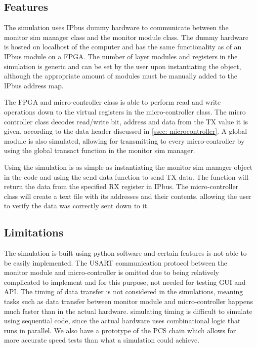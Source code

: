 \documentclass[main.tex]{subfiles}
\begin{document}

\subsection{Features}

The simulation uses IPbus dummy hardware to communicate between the monitor sim manager class and the monitor module class. The dummy hardware is hosted on localhost of the computer and has the same functionality as of an IPbus module on a FPGA.  The number of layer modules and registers in the simulation is generic and can be set by the user upon instantiating the object, although the appropriate amount of modules must be manually added to the IPbus address map.

The FPGA and micro-controller class is able to perform read and write operations down to the virtual registers in the micro-controller class. The micro controller class decodes read/write bit, address and data from the TX value it is given, according to the data header discussed in \autoref{ssec: microcontroller}. A global module is also simulated, allowing for transmitting to every micro-controller by using the global transact function in the monitor sim manager. 

Using the simulation is as simple as instantiating the monitor sim manager object in the code and using the send data function to send TX data. The function will return the data from the specified RX register in IPbus. The micro-controller class will create a text file with its addresses and their contents, allowing the user to verify the data was correctly sent down to it.

\subsection{Limitations}

The simulation is built using python software and certain features is not able to be easily implemented. The USART communication protocol between the monitor module and micro-controller is omitted due to being relatively complicated to implement and for this purpose, not needed for testing GUI and API. 
The timing of data transfer is not considered in the simulations, meaning tasks such as data transfer between monitor module and micro-controller happens much faster than in the actual hardware. simulating timing is difficult to simulate using sequential code, since the actual hardware uses combinational logic that runs in parallel. We also have a prototype of the PCS chain which allows for more accurate speed tests than what a simulation could achieve. 
\end{document}
